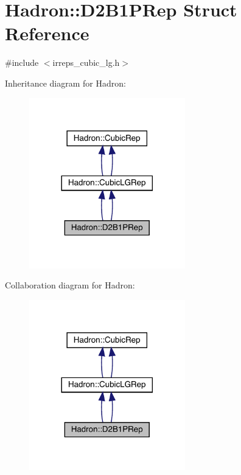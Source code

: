 \hypertarget{structHadron_1_1D2B1PRep}{}\section{Hadron\+:\+:D2\+B1\+P\+Rep Struct Reference}
\label{structHadron_1_1D2B1PRep}


{\ttfamily \#include $<$irreps\+\_\+cubic\+\_\+lg.\+h$>$}



Inheritance diagram for Hadron\+:\nopagebreak
\begin{figure}[H]
\begin{center}
\leavevmode
\includegraphics[width=192pt]{d2/d80/structHadron_1_1D2B1PRep__inherit__graph}
\end{center}
\end{figure}


Collaboration diagram for Hadron\+:\nopagebreak
\begin{figure}[H]
\begin{center}
\leavevmode
\includegraphics[width=192pt]{dc/d9c/structHadron_1_1D2B1PRep__coll__graph}
\end{center}
\end{figure}
